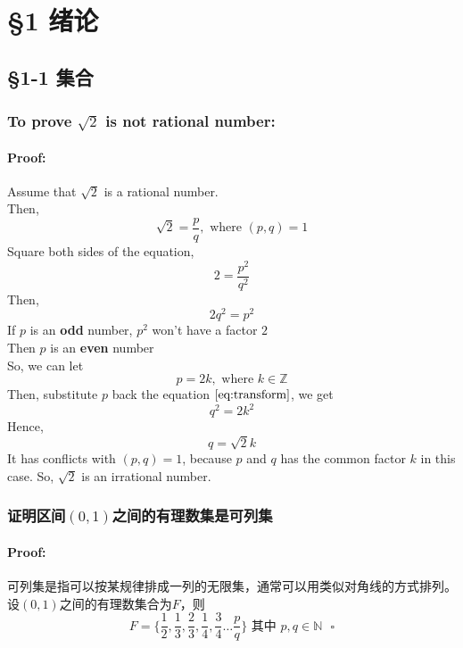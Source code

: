 \documentclass{article}
\begin{document}
\section{\S1 绪论}
\subsection{\S1-1 集合}
\subsubsection{To prove $ \sqrt{2} $ is not rational number:}
\paragraph{Proof:}
Assume that $\sqrt{2}$ is a rational number.\\
Then, 
\begin{equation*}
    \sqrt{2} = \frac{p}{q}, \text{ where } (p, q) = 1
\end{equation*}
Square both sides of the equation,
\begin{equation*}
    2 = \frac{p^2}{q^2}
\end{equation*}
Then, 
\begin{equation}
    2q^2 = p^2
    \label{eq:transform}
\end{equation}
If $p$ is an \textbf{odd} number, $p^2$ won't have a factor $2$\\
Then $p$ is an \textbf{even} number \\
So, we can let 
\begin{equation*}
    p = 2k, \text{ where } k \in \mathbb{Z}
\end{equation*}
Then, substitute $p$ back the equation $\ref{eq:transform}$, we get
\begin{equation*}
    q^2 = 2k^2
\end{equation*}
Hence, 
\begin{equation*}
    q = \sqrt{2}k
\end{equation*}
It has conflicts with $(p, q) = 1$, because $p$ and $q$ has the common factor $k$ in this case.
So, $\sqrt{2}$ is an irrational number. \square

\subsubsection{证明区间$(0, 1)$之间的有理数集是可列集}
\paragraph{Proof:}
可列集是指可以按某规律排成一列的无限集，通常可以用类似对角线的方式排列。\\
设$(0, 1)$之间的有理数集合为$F$，则
\begin{equation*}
    F = \{\frac{1}{2}, \frac{1}{3}, \frac{2}{3}, \frac{1}{4}, \frac{3}{4} \dots{} \frac{p}{q}\} \text{ 其中 } p, q \in \mathbb{N} \text{ } \square
\end{equation*}
\end{document}
